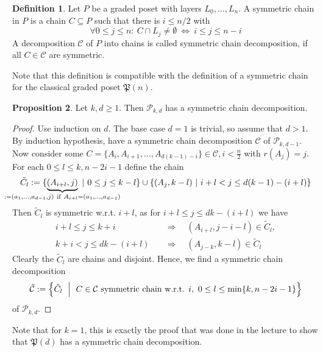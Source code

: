 \documentclass{scrartcl}
\newcommand{\powerset}{\mathfrak{P}}
\theoremstyle{definition}
\newtheorem{definition}{Definition}
\newtheorem{proposition}[definition]{Proposition}
\begin{document}
\begin{definition}
    Let $P$ be a graded poset with layers $L_0, ..., L_n$.
    A symmetric chain in $P$ is a chain $C \subseteq P$ such that there is $i \leq n/2$ with
    \begin{equation*}
        \forall 0 \leq j \leq n: \ C \cap L_j \neq \emptyset \ \Leftrightarrow \ i \leq j \leq n - i
    \end{equation*}
    A decomposition $\mathcal{C}$ of $P$ into chains is called symmetric chain decomposition, if all $C \in \mathcal{C}$ are symmetric.
\end{definition}
Note that this definition is compatible with the definition of a symmetric chain for the classical graded poset $\powerset(n)$.
\begin{proposition}
    Let $k, d \geq 1$. Then $\mathcal{P}_{k, d}$ has a symmetric chain decomposition.
\end{proposition}
\begin{proof}
    Use induction on $d$.
    The base case $d = 1$ is trivial, so assume that $d > 1$.
    By induction hypothesis, have a symmetric chain decomposition $\mathcal{C}$ of $\mathcal{P}_{k, d - 1}$.
    Now consider some $C = \{ A_i, A_{i + 1}, ..., A_{d(k - 1) - i} \} \in \mathcal{C}, i < \frac n 2$ with $r(A_j) = j$.
    For each $0 \leq l \leq k, n - 2i - 1$ define the chain
    \begin{equation*}
        \tilde{C}_l := \{ \underbrace{(A_{i + l}, j)}_{\mathclap{:= (a_1, ..., a_{d - 1}, j) \ \text{if} \ A_{i + l} = (a_1, ..., a_{d - 1})}} \ | \ 0 \leq j \leq k - l \} \cup \{ (A_j, k - l) \ | \ i + l < j \leq d(k - 1) - (i + l) \}
    \end{equation*}
    Then $\tilde{C}_l$ is symmetric w.r.t. $i + l$, as for $i + l \leq j \leq dk - (i + l)$ we have
    \begin{align*}
        i + l \leq j \leq k + i \quad &\Rightarrow \quad (A_{i + l}, j - i - l) \in \tilde{C}_l, \\
        k + i < j \leq dk - (i + l) \quad &\Rightarrow \quad (A_{j - k}, k - l) \in \tilde{C}_l
    \end{align*}
    Clearly the $\tilde{C}_l$ are chains and disjoint.
    Hence, we find a symmetric chain decomposition
    \begin{equation*}
        \tilde{\mathcal{C}} := \Bigl\{ \tilde{C}_l \ \Bigm| \ C \in \mathcal{C} \ \text{symmetric chain w.r.t. $i$}, \ 0 \leq l \leq \min\{ k, n - 2i - 1 \} \Bigr\}
    \end{equation*}
    of $\mathcal{P}_{k, d}$.
\end{proof}
Note that for $k = 1$, this is exactly the proof that was done in the lecture to show that $\powerset(d)$ has a symmetric chain decomposition.
\end{document}
